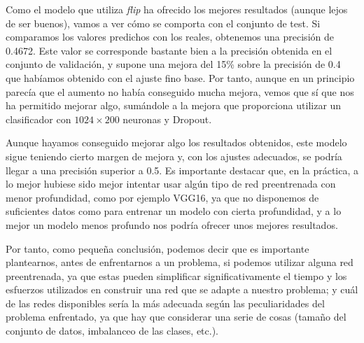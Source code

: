 \documentclass[11pt,a4paper]{article}
\begin{document}
Como el modelo que utiliza \textit{flip} ha ofrecido los mejores resultados (aunque lejos de 
ser buenos), vamos a ver cómo se comporta con el conjunto de test. Si comparamos los valores
predichos con los reales, obtenemos una precisión de 0.4672. Este valor se corresponde bastante bien
a la precisión obtenida en el conjunto de validación, y supone una mejora del 15\% sobre la precisión
de 0.4 que habíamos obtenido con el ajuste fino base. Por tanto, aunque en un principio parecía
que el aumento no había conseguido mucha mejora, vemos que sí que nos ha permitido mejorar algo,
sumándole a la mejora que proporciona utilizar un clasificador con $1024 \times 200$ neuronas y
Dropout.

Aunque hayamos conseguido mejorar algo los resultados obtenidos, este modelo sigue teniendo cierto margen
de mejora y, con los ajustes adecuados, se podría llegar a una precisión superior a 0.5. Es importante
destacar que, en la práctica, a lo mejor hubiese sido mejor intentar usar algún tipo de red preentrenada
con menor profundidad, como por ejemplo VGG16, ya que no disponemos de suficientes datos como para entrenar
un modelo con cierta profundidad, y a lo mejor un modelo menos profundo nos podría ofrecer unos mejores
resultados.

Por tanto, como pequeña conclusión, podemos decir que es importante plantearnos, antes de enfrentarnos
a un problema, si podemos utilizar alguna red preentrenada, ya que estas pueden simplificar significativamente
el tiempo y los esfuerzos utilizados en construir una red que se adapte a nuestro problema; y cuál de las redes
disponibles sería la más adecuada según las peculiaridades del problema enfrentado, ya que hay que considerar
una serie de cosas (tamaño del conjunto de datos, imbalanceo de las clases, etc.). 

\newpage



\end{document}
